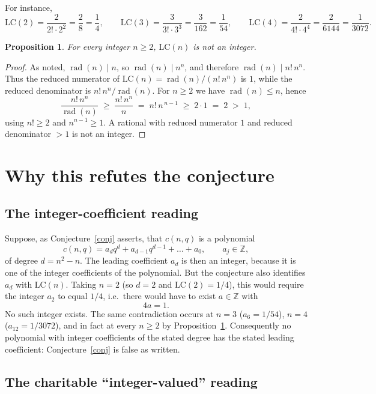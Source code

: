 \documentclass[11pt]{article}
\newtheorem{proposition}{Proposition}
\theoremstyle{remark}
\newcommand{\LC}{\mathrm{LC}}
\DeclareMathOperator{\rad}{rad}
\begin{document}
For instance,
\[
\LC(2)=\frac{2}{2!\cdot 2^{2}}=\frac{2}{8}=\frac14,\qquad
\LC(3)=\frac{3}{3!\cdot 3^{3}}=\frac{3}{162}=\frac{1}{54},\qquad
\LC(4)=\frac{2}{4!\cdot 4^{4}}=\frac{2}{6144}=\frac{1}{3072}.
\]

\begin{proposition}\label{prop:nonint}
For every integer $n\ge 2$, $\LC(n)$ is not an integer.
\end{proposition}

\begin{proof}
As noted, $\rad(n)\mid n$, so $\rad(n)\mid n^n$, and therefore
$\rad(n) \mid n!\,n^n$. Thus the reduced numerator of
$\LC(n)=\rad(n)/(n!\,n^n)$ is $1$, while the reduced denominator is
$n!\,n^n/\rad(n)$. For $n\ge 2$ we have $\rad(n)\le n$, hence
\[
\frac{n!\,n^n}{\rad(n)} \;\ge\; \frac{n!\,n^n}{n} \;=\; n!\,n^{\,n-1}
\;\ge\; 2\cdot 1 \;=\; 2 \;>\; 1,
\]
using $n!\ge 2$ and $n^{n-1}\ge 1$. A rational with reduced numerator $1$ and
reduced denominator $>1$ is not an integer.
\end{proof}

\section{Why this refutes the conjecture}

\subsection{The integer-coefficient reading}

Suppose, as Conjecture~\ref{conj} asserts, that $c(n,q)$ is a polynomial
\[
c(n,q) = a_d q^d + a_{d-1}q^{d-1} + \dots + a_0,\qquad a_j\in\mathbb{Z},
\]
of degree $d=n^2-n$. The leading coefficient $a_d$ is then an integer, because
it is one of the integer coefficients of the polynomial. But the conjecture also
identifies $a_d$ with $\LC(n)$. Taking $n=2$ (so $d=2$ and $\LC(2)=1/4$), this
would require the integer $a_2$ to equal $1/4$, i.e.\ there would have to exist
$a\in\mathbb{Z}$ with
\[
4a = 1 .
\]
No such integer exists. The same contradiction occurs at $n=3$ ($a_6=1/54$),
$n=4$ ($a_{12}=1/3072$), and in fact at every $n\ge2$ by
Proposition~\ref{prop:nonint}. Consequently no polynomial with integer
coefficients of the stated degree has the stated leading coefficient:
Conjecture~\ref{conj} is false as written.

\subsection{The charitable ``integer-valued'' reading}
\end{document}
